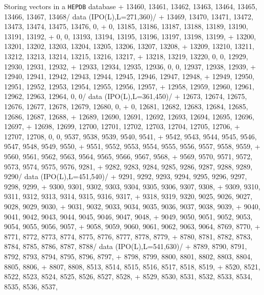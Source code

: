 \begin{XMPt}{Storing vectors in a {\tt HEPDB} database}
     + 13460, 13461, 13462, 13463, 13464, 13465, 13466, 13467, 13468/
      data (IPO(L),L=271,360)/
     + 13469, 13470, 13471, 13472, 13473, 13474, 13475, 13476,     0,
     +     0, 13185, 13186, 13187, 13188, 13189, 13190, 13191, 13192,
     +     0,     0, 13193, 13194, 13195, 13196, 13197, 13198, 13199,
     + 13200, 13201, 13202, 13203, 13204, 13205, 13206, 13207, 13208,
     + 13209, 13210, 13211, 13212, 13213, 13214, 13215, 13216, 13217,
     + 13218, 13219, 13220,     0,     0, 12929, 12930, 12931, 12932,
     + 12933, 12934, 12935, 12936,     0,     0, 12937, 12938, 12939,
     + 12940, 12941, 12942, 12943, 12944, 12945, 12946, 12947, 12948,
     + 12949, 12950, 12951, 12952, 12953, 12954, 12955, 12956, 12957,
     + 12958, 12959, 12960, 12961, 12962, 12963, 12964,     0,     0/
      data (IPO(L),L=361,450)/
     + 12673, 12674, 12675, 12676, 12677, 12678, 12679, 12680,     0,
     +     0, 12681, 12682, 12683, 12684, 12685, 12686, 12687, 12688,
     + 12689, 12690, 12691, 12692, 12693, 12694, 12695, 12696, 12697,
     + 12698, 12699, 12700, 12701, 12702, 12703, 12704, 12705, 12706,
     + 12707, 12708,     0,     0,  9537,  9538,  9539,  9540,  9541,
     +  9542,  9543,  9544,  9545,  9546,  9547,  9548,  9549,  9550,
     +  9551,  9552,  9553,  9554,  9555,  9556,  9557,  9558,  9559,
     +  9560,  9561,  9562,  9563,  9564,  9565,  9566,  9567,  9568,
     +  9569,  9570,  9571,  9572,  9573,  9574,  9575,  9576,  9281,
     +  9282,  9283,  9284,  9285,  9286,  9287,  9288,  9289,  9290/
      data (IPO(L),L=451,540)/
     +  9291,  9292,  9293,  9294,  9295,  9296,  9297,  9298,  9299,
     +  9300,  9301,  9302,  9303,  9304,  9305,  9306,  9307,  9308,
     +  9309,  9310,  9311,  9312,  9313,  9314,  9315,  9316,  9317,
     +  9318,  9319,  9320,  9025,  9026,  9027,  9028,  9029,  9030,
     +  9031,  9032,  9033,  9034,  9035,  9036,  9037,  9038,  9039,
     +  9040,  9041,  9042,  9043,  9044,  9045,  9046,  9047,  9048,
     +  9049,  9050,  9051,  9052,  9053,  9054,  9055,  9056,  9057,
     +  9058,  9059,  9060,  9061,  9062,  9063,  9064,  8769,  8770,
     +  8771,  8772,  8773,  8774,  8775,  8776,  8777,  8778,  8779,
     +  8780,  8781,  8782,  8783,  8784,  8785,  8786,  8787,  8788/
      data (IPO(L),L=541,630)/
     +  8789,  8790,  8791,  8792,  8793,  8794,  8795,  8796,  8797,
     +  8798,  8799,  8800,  8801,  8802,  8803,  8804,  8805,  8806,
     +  8807,  8808,  8513,  8514,  8515,  8516,  8517,  8518,  8519,
     +  8520,  8521,  8522,  8523,  8524,  8525,  8526,  8527,  8528,
     +  8529,  8530,  8531,  8532,  8533,  8534,  8535,  8536,  8537,

\end{XMPt}
